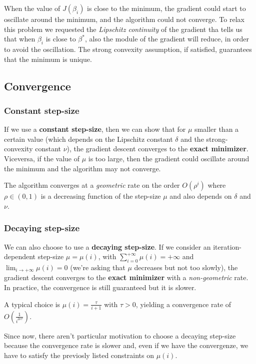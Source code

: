 When the value of $J(\beta_i)$ is close to the minimum, the gradient could start to oscillate around the minimum, and the algorithm could not converge. To relax this problem we requested the \textit{Lipschitz continuity} of the gradient tha tells us that when $\beta_i$ is close to $\beta^\ast$, also the module of the gradient will reduce, in order to avoid the oscillation.
The strong convexity assumption, if satisfied, guarantees that the minimum is unique. 

\subsection{Convergence}
\subsubsection*{Constant step-size}
If we use a \textbf{constant step-size}, then we can show that for $\mu$ smaller than a certain value (which depends on the Lipschitz constant $\delta$ and the strong-convexity constant $\nu$), the gradient descent converges to the \textbf{exact minimizer}.
Viceversa, if the value of $\mu$ is too large, then the gradient could oscillate around the minimum and the algorithm may not converge.

The algorithm converges at a \textit{geometric} rate on the order $O(\rho^i)$ where $\rho \in (0,1)$ is a decreasing function of the step-size $\mu$ and also depends on $\delta$ and $\nu$.

\subsubsection*{Decaying step-size}
We can also choose to use a \textbf{decaying step-size}. 
If we consider an iteration-dependent step-size $\mu = \mu(i)$, with $\sum_{i=0}^{+\infty} \mu(i) = +\infty$ and $\lim_{i \to +\infty} \mu(i) = 0$ (we're asking that $\mu$ decreases but not too slowly), the gradient descent converges to the \textbf{exact minimizer} with a \textit{non-geometric} rate.
In practice, the convergence is still guaranteed but it is slower.

A typical choice is $\mu(i) = \frac{\tau}{i + 1}$ with $\tau > 0$, yielding a convergence rate of $O(\frac{1}{i^{2 \nu \tau}})$.

Since now, there aren't particular motivation to choose a decaying step-size because the convergence rate is slower and, even if we have the convergenze, we have to satisfy the previosly listed constraints on $\mu(i)$.


